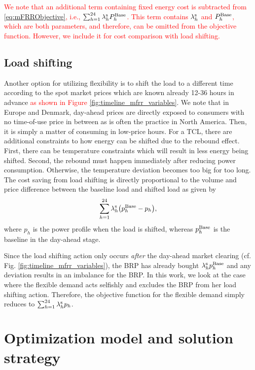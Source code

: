 \documentclass[11pt,a4paper]{article}
\begin{document}
\textcolor{red}{We note that an additional term containing fixed energy cost is subtracted from \eqref{eq:mFRRObjective}, i.e., $\sum_{h=1}^{24} \lambda^{\rm{s}}_{h}P^{\rm{Base}}_{h}$. This term contains $\lambda^{\rm{s}}_{h}$ and $P^{\rm{Base}}_{h}$, which are both parameters, and therefore, can be omitted from the objective function. However, we include it for cost comparison with load shifting.}

\subsection{Load shifting}
%
Another option for utilizing flexibility is to shift the load to a different time according to the spot market prices which are known already 12-36 hours in advance \textcolor{red}{as shown in Figure \ref{fig:timeline_mfrr_variables}}. We note that in Europe and Denmark, day-ahead prices are directly exposed to consumers with no time-of-use price in between as is often the practice in North America. Then, it is simply a matter of consuming in low-price hours.
%
For a TCL, there are additional constraints to how energy can be shifted due to the rebound effect. First, there can be temperature constraints which will result in less energy being shifted. Second, the rebound must happen immediately after reducing power consumption. Otherwise, the temperature deviation becomes too big for too long.
The cost saving from load shifting is directly proportional to the volume and price difference between the baseline load and shifted load as given by
%
\begin{equation}\label{eq:load_shifting_savings}
    \sum_{h=1}^{24} \lambda^{\rm{s}}_{h} \big(p^{\rm{Base}}_{h} -  p_{h}\big),
\end{equation}
%
where $p_{h}$ is the power profile when the load is shifted, whereas $p^{\rm{Base}}_{h}$ is the baseline in the day-ahead stage.

Since the load shifting action only occurs \textit{after} the day-ahead market clearing (cf. Fig. \ref{fig:timeline_mfrr_variables}), the BRP has already bought $\lambda^{\rm{s}}_{h} p^{\rm{Base}}_{h}$ and any deviation results in an imbalance for the BRP. In this work, we look at the case where the flexible demand acts selfishly and excludes the BRP from her load shifting action. Therefore, the objective function for the flexible demand simply reduces to $\sum_{h=1}^{24} \lambda_{h}^{\rm{s}} p_{h}$.


\section{Optimization model and solution strategy}\label{sec:OptimizationModel}
\end{document}

